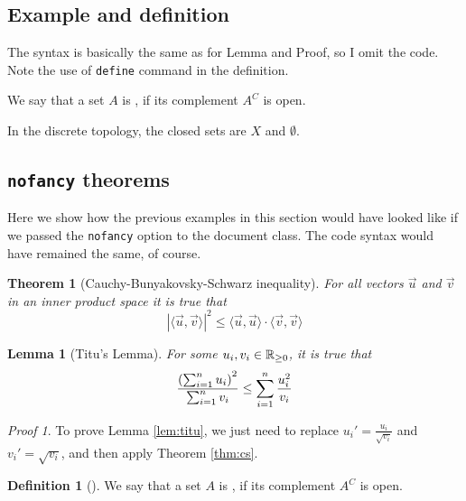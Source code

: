 \documentclass[letterpaper,11pt]{notes}
\theoremstyle{definition}
\newtheorem{dfn}{Definition}[section]
\theoremstyle{plain}
\newtheorem{Ithm}{Theorem}[section]
\newtheorem{Ilem}{Lemma}[section]
\newenvironment{definitionA}[2]
    {\begin{dfn}[#1]\ifstrempty{#2}{}{\label{dfnA:#2}}}
    {\end{dfn}}
\newenvironment{lemA}[2]
    {\begin{Ilem}[#1]\ifstrempty{#2}{}{\label{lemA:#2}}}
    {\end{Ilem}}
\newenvironment{thmA}[2]
    {\begin{Ithm}[#1]\ifstrempty{#2}{}{\label{thmA:#2}}}
    {\end{Ithm}}
\theoremstyle{remark}
\newtheorem*{proofA}{Proof}
\begin{document}
\subsection{Example and definition}
The syntax is basically the same as for Lemma and Proof, so I omit the code. Note the use of \texttt{define} command in the definition.

\begin{definition}{}{}
We say that a set $A$ is , if its complement $A^C$ is open.
\end{definition}

\begin{example}{}{}
In the discrete topology, the closed sets are $X$ and $\emptyset$.
\end{example}

\subsection{\texttt{nofancy} theorems} \label{nofancy}
Here we show how the previous examples in this section would have looked like if we passed the \texttt{nofancy} option to the document class. The code syntax would have remained the same, of course.

\begin{thmA}{Cauchy-Bunyakovsky-Schwarz inequality}{cs}
For all vectors $\vec{u}$ and $\vec{v}$ in an inner product space it is true that
\begin{equation}
    \left|\langle\vec{u}, \vec{v}\rangle\right|^2 \leq \langle\vec{u}, \vec{u} \rangle \cdot \langle\vec{v}, \vec{v} \rangle 
\end{equation}
\end{thmA}

\begin{lemA}{Titu's Lemma}{titu}
For some $u_i, v_i \in \mathbb{R}_{\geq 0}$, it is true that
\begin{equation}
    \frac{\left(\sum_{i=1}^n u_i\right)^2}{\sum_{i=1}^n v_i} \leq \sum_{i=1}^n \frac{u_i^2}{v_i}
\end{equation}
\end{lemA}

\begin{proofA}
To prove Lemma \ref{lem:titu}, we just need to replace $u_i' = \frac{u_i}{\sqrt{v_i}}$ and $v_i' = \sqrt{v_i}$, and then apply Theorem \ref{thm:cs}. \hfill \qedsymbol %
\end{proofA}

\begin{definitionA}{}{}
We say that a set $A$ is , if its complement $A^C$ is open.
\end{definitionA}
\end{document}
